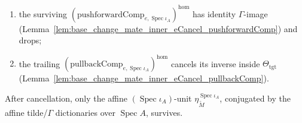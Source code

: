 \begin{lemma}
\begin{enumerate}
      (Lemma~\ref{lem:base_change_mate_inner_eCancel_eUnit}) and cancels the inverse \(e\)-unit
      built into \(\Theta_{\mathrm{tgt}}\);
    \item the surviving
      \((\mathrm{pushforwardComp}_{e,\operatorname{Spec}\iota_A})^{\mathrm{hom}}\) has identity
      \(\Gamma\)-image (Lemma~\ref{lem:base_change_mate_inner_eCancel_pushforwardComp}) and drops;
    \item the trailing
      \((\mathrm{pullbackComp}_{e,\operatorname{Spec}\iota_A})^{\mathrm{hom}}\) cancels its inverse
      inside \(\Theta_{\mathrm{tgt}}\)
      (Lemma~\ref{lem:base_change_mate_inner_eCancel_pullbackComp}).
  \end{enumerate}
  After cancellation, only the affine \((\operatorname{Spec}\iota_A)\)-unit
  \(\eta^{\operatorname{Spec}\iota_A}_{\widetilde M}\), conjugated by the affine tilde/\(\Gamma\)
  dictionaries over \(\operatorname{Spec} A\), survives.
\end{lemma}

